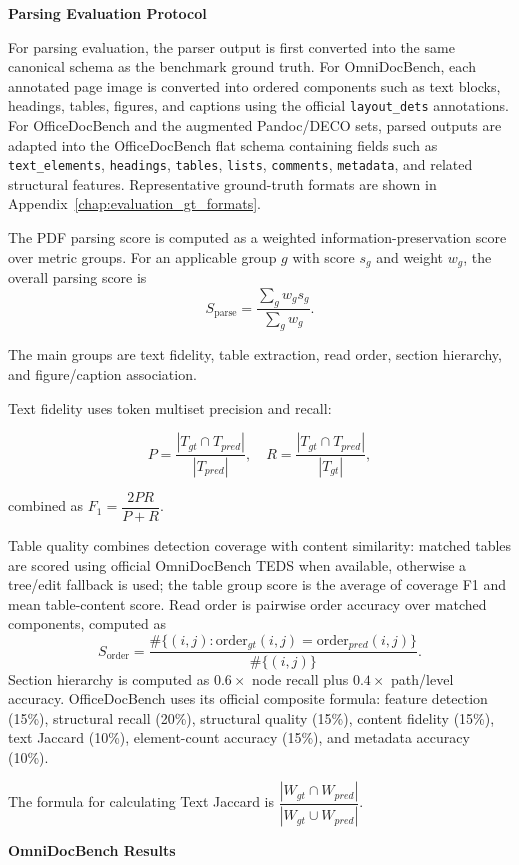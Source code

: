 \textbf{Parsing Evaluation Protocol}

For parsing evaluation, the parser output is first converted into the same canonical schema as the benchmark ground truth. For OmniDocBench, each annotated page image is converted into ordered components such as text blocks, headings, tables, figures, and captions using the official \texttt{layout\_dets} annotations. For OfficeDocBench and the augmented Pandoc/DECO sets, parsed outputs are adapted into the OfficeDocBench flat schema containing fields such as \texttt{text\_elements}, \texttt{headings}, \texttt{tables}, \texttt{lists}, \texttt{comments}, \texttt{metadata}, and related structural features. Representative ground-truth formats are shown in Appendix~\ref{chap:evaluation_gt_formats}.

The PDF parsing score is computed as a weighted information-preservation score over metric groups. For an applicable group $g$ with score $s_g$ and weight $w_g$, the overall parsing score is
\[
S_{\mathrm{parse}} = \dfrac{\sum_g w_g s_g}{\sum_g w_g}.
\]

The main groups are text fidelity, table extraction, read order, section hierarchy, and figure/caption association. 

Text fidelity uses token multiset precision and recall:

$$P=\dfrac{|T_{gt}\cap T_{pred}|}{|T_{pred}|}, \quad R=\dfrac{|T_{gt}\cap T_{pred}|}{|T_{gt}|},$$

combined as $F_1=\dfrac{2PR}{P+R}$. 

Table quality combines detection coverage with content similarity: matched tables are scored using official OmniDocBench TEDS when available, otherwise a tree/edit fallback is used; the table group score is the average of coverage F1 and mean table-content score. Read order is pairwise order accuracy over matched components, computed as
\[
S_{\mathrm{order}} = \dfrac{\#\{(i,j): \mathrm{order}_{gt}(i,j)=\mathrm{order}_{pred}(i,j)\}}{\#\{(i,j)\}}.
\]
Section hierarchy is computed as $0.6 \times$ node recall plus $0.4 \times$ path/level accuracy. OfficeDocBench uses its official composite formula: feature detection (15\%), structural recall (20\%), structural quality (15\%), content fidelity (15\%), text Jaccard (10\%), element-count accuracy (15\%), and metadata accuracy (10\%). 

The formula for calculating Text Jaccard is $\dfrac{|W_{gt}\cap W_{pred}|}{|W_{gt}\cup W_{pred}|}$.

\textbf{OmniDocBench Results}

